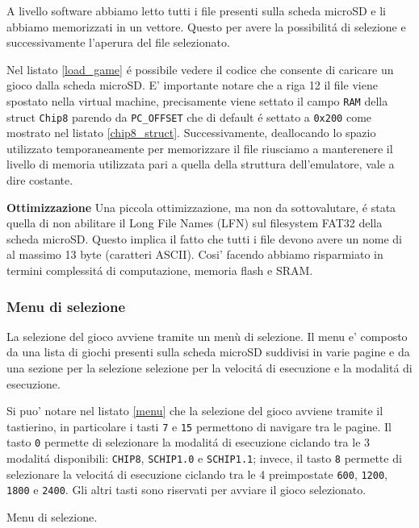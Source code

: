 \documentclass[a4paper]{article}
\begin{document}
A livello software abbiamo letto tutti i file presenti sulla scheda microSD e li abbiamo memorizzati in un vettore. Questo per avere la possibilitá di selezione e successivamente l'aperura del file selezionato.

Nel listato \ref{load_game} é possibile vedere il codice che consente di caricare un gioco dalla scheda microSD. E' importante notare che a riga 12 il file viene spostato nella virtual machine, precisamente viene settato il campo \texttt{RAM} della struct \texttt{Chip8} parendo da \texttt{PC\_OFFSET} che di default é settato a \texttt{0x200} come mostrato nel listato \ref{chip8_struct}. Successivamente, deallocando lo spazio utilizzato temporaneamente per memorizzare il file riusciamo a manterenere il livello di memoria utilizzata pari a quella della struttura dell'emulatore, vale a dire costante.

\textbf{Ottimizzazione} \quad  Una piccola ottimizzazione, ma non da sottovalutare, é stata quella di non abilitare il Long File Names (LFN) sul filesystem FAT32 della scheda microSD. Questo implica il fatto che tutti i file devono avere un nome di al massimo 13 byte (caratteri ASCII). Cosi' facendo abbiamo risparmiato in termini complessitá di computazione, memoria flash e SRAM.

\subsubsection{Menu di selezione}

La selezione del gioco avviene tramite un menù di selezione. Il menu e' composto da una lista di giochi presenti sulla scheda microSD suddivisi in varie pagine e da una sezione per la selezione selezione per la velocitá di esecuzione e la modalitá di esecuzione.

Si puo' notare nel listato \ref{menu} che la selezione del gioco avviene tramite il tastierino, in particolare i tasti \texttt{7} e \texttt{15} permettono di navigare tra le pagine. Il tasto \texttt{0} permette di selezionare la modalitá di esecuzione ciclando tra le 3 modalitá disponibili: \texttt{CHIP8}, \texttt{SCHIP1.0} e \texttt{SCHIP1.1}; invece, il tasto \texttt{8} permette di selezionare la velocitá di esecuzione ciclando tra le 4 preimpostate \texttt{600}, \texttt{1200}, \texttt{1800} e \texttt{2400}. Gli altri tasti sono riservati per avviare il gioco selezionato.

\begin{Listing}[h!t] %
    \centering
    \caption{Menu di selezione.}
    \label{menu}
\end{Listing}
\end{document}
